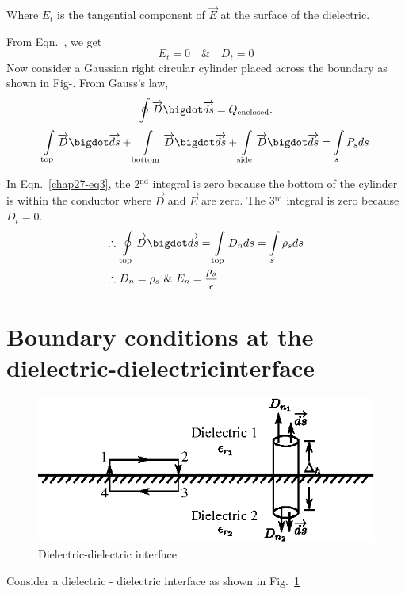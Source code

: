 Where $E_{t}$ is the tangential component of $\overrightarrow{E}$ at the surface of the dielectric. 

From Eqn.~\label{chap27-eq2}, we get 
$$
 E_{t} = 0\quad \text{\&}\quad D_{t} = 0
$$
Now consider a Gaussian right circular cylinder placed across the boundary as shown in Fig-. From Gauss's law, 
$$
\oint \overrightarrow{D} \bigdot \overrightarrow{ds} = Q_{\text{enclosed}}.
$$
\begin{equation*}
\int\limits_{\text{top}} \overrightarrow{D} \bigdot \overrightarrow{ds} + \int\limits_{\text{bottom}} \overrightarrow{D} \bigdot \overrightarrow{ds} + \int\limits_{\text{side}} \overrightarrow{D} \bigdot \overrightarrow{ds} = \int\limits_{s} P_{s}ds\label{chap27-eq3}
\end{equation*}

In Eqn.~\eqref{chap27-eq3}, the 2$^{\text{nd}}$ integral is zero because the bottom of the cylinder is within the conductor where $\overrightarrow{D}$ and $\overrightarrow{E}$ are zero. The 3$^{\text{rd}}$ integral is zero because $D_{t} = 0$. 
\begin{align*}
\therefore \ & \oint\limits_{\text{top}} \overrightarrow{D} \bigdot \overrightarrow{ds} = \int\limits_{\text{top}} D_{n}ds = \int\limits_{s} \rho_{s}ds\\
\therefore \ & D_{n} = \rho_{s} ~\&~ E_{n} = \dfrac{\rho_{s}}{\epsilon}
\end{align*}

\section{Boundary conditions at the dielectric-dielectric\break interface}\label{chap27-sec2}
\begin{figure}[H]
\centering
\includegraphics[scale=1.1]{images/fig2.eps}
\caption{Dielectric-dielectric interface}\label{chap27-fig2}
\end{figure}


Consider a dielectric - dielectric interface as shown in Fig.~\ref{chap27-fig2}

